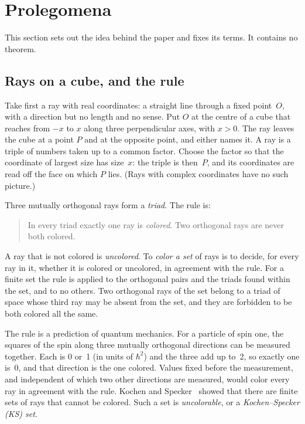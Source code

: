 \section{Prolegomena}\label{sec:prolegomena}

This section sets out the idea behind the paper and fixes its terms.  It contains no theorem.

\subsection{Rays on a cube, and the rule}\label{sec:rule}

Take first a ray with real coordinates: a straight line through a fixed point~$O$, with a
direction but no length and no sense.  Put $O$ at the centre of a cube that reaches from $-x$
to $x$ along three perpendicular axes, with $x>0$.  The ray leaves the cube at a point $P$ and
at the opposite point, and either names it.  A ray is a triple of numbers taken up to a common
factor.  Choose the factor so that the coordinate of largest size has size~$x$: the triple is
then~$P$, and its coordinates are read off the face on which $P$ lies.  (Rays with complex
coordinates have no such picture.)

Three mutually orthogonal rays form a \emph{triad}.  The rule is:

\begin{quote}
In every triad exactly one ray is \emph{colored}.  Two orthogonal rays are never both colored.
\end{quote}

A ray that is not colored is \emph{uncolored}.  To \emph{color a set} of rays is to decide, for
every ray in it, whether it is colored or uncolored, in agreement with the rule.  For a finite
set the rule is applied to the orthogonal pairs and the triads found within the set, and to no
others.  Two orthogonal rays of the set belong to a triad of space whose third ray may be
absent from the set, and they are forbidden to be both colored all the same.

The rule is a prediction of quantum mechanics.  For a particle of spin one, the squares of the
spin along three mutually orthogonal directions can be measured together.  Each is 0 or~1 (in
units of $\hbar^2$) and the three add up to~2, so exactly one is~0, and that direction is the
one colored.  Values fixed before the measurement, and independent of which two other
directions are measured, would color every ray in agreement with the rule.  Kochen and
Specker~\cite{KochenSpecker1967} showed that there are finite sets of rays that cannot be
colored.  Such a set is \emph{uncolorable}, or a \emph{Kochen--Specker (KS) set}.

